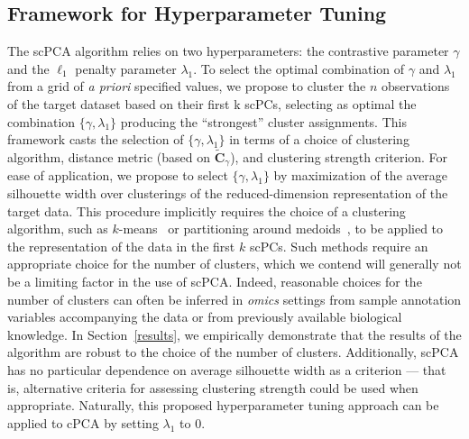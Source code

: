 \subsection{Framework for Hyperparameter Tuning}\label{hyp_tune}

The scPCA algorithm relies on two hyperparameters: the contrastive parameter $\gamma$ and the $\ell_1$ penalty parameter $\lambda_1$. To select the optimal combination of $\gamma$ and $\lambda_1$ from a grid of \textit{a priori} specified values, we propose to cluster the $n$ observations of the target dataset based on their first k scPCs, selecting as optimal the combination $\{\gamma, \lambda_1\}$ producing the ``strongest'' cluster assignments. This framework casts the selection of $\{\gamma, \lambda_1\}$ in terms of a choice of clustering algorithm, distance metric (based on $\widetilde{\mathbf{C}}_{\gamma}$), and clustering strength criterion. For ease of application, we propose to select $\{\gamma, \lambda_1\}$ by maximization of the average silhouette width over clusterings of the reduced-dimension representation of the target data. This procedure implicitly requires the choice of a clustering algorithm, such as $k$-means~\citep{kmeans} or partitioning around medoids~\citep{pam}, to be applied to the representation of the data in the first $k$ scPCs. Such methods require an appropriate choice for the number of clusters, which we contend will generally not be a limiting factor in the use of scPCA. Indeed, reasonable choices for the number of clusters can often be inferred in \textit{omics} settings from sample annotation variables accompanying the data or from previously available biological knowledge. In Section~\ref{results}, we empirically demonstrate that the results of the algorithm are robust to the choice of the number of clusters. Additionally, scPCA has no particular dependence on average silhouette width as a criterion --- that is, alternative criteria for assessing clustering strength could be used when appropriate. %
Naturally, this proposed hyperparameter tuning approach can be applied to cPCA by setting $\lambda_1$ to $0$.


